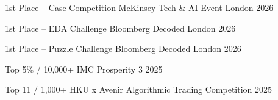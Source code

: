 

\begin{cvhonors}

  \cvhonor
    {1st Place -- Case Competition} %
    {McKinsey Tech \& AI Event} %
    {London} %
    {2026} %

  \cvhonor
    {1st Place -- EDA Challenge} %
    {Bloomberg Decoded} %
    {London} %
    {2026} %

  \cvhonor
    {1st Place -- Puzzle Challenge} %
    {Bloomberg Decoded} %
    {London} %
    {2026} %

  \cvhonor
    {Top 5\% / 10,000+} %
    {IMC Prosperity 3} %
    {} %
    {2025} %

  \cvhonor
    {Top 11 / 1,000+} %
    {HKU x Avenir Algorithmic Trading Competition} %
    {} %
    {2025} %

\end{cvhonors}
